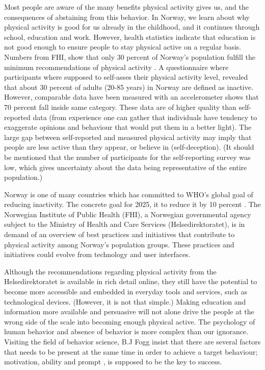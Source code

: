 Most people are aware of the many benefits physical activity gives us, and the consequences of abstaining from this behavior. In Norway, we learn about why physical activity is good for us already in the childhood, and it continues through school, education and work. However, health statistics indicate that education is not good enough to ensure people to stay physical active on a regular basis. Numbers from FHI, show that only 30 percent of Norway's population fulfill the minimum recommendations of physical activity \cite{folkehelseinstituttet_fysisk_nodate}. %
A questionnaire where participants where supposed to self-asses their physical activity level, revealed that about 30 percent of adults (20-85 years) in Norway are defined as inactive. However, comparable data have been measured with an accelerometer shows that 70 percent fall inside same category. These data are of higher quality than self-reported data (from experience one can gather that individuals have tendency to exaggerate opinions and behaviour that would put them in a better light). The large gap between self-reported and measured physical activity may imply that people are less active than they appear, or believe in (self-deception). (It should be mentioned that the number of participants for the self-reporting survey was low, which gives uncertainty about the data being representative of the entire population.) 

Norway is one of many countries which has committed to WHO's global goal of reducing inactivity. The concrete goal for 2025, it to reduce it by 10 percent \cite{noauthor_inaktivitet_nodate}.
The Norwegian Institute of Public Health (FHI), a Norwegian governmental agency subject to the Ministry of Health and Care Services (Helsedirektoratet), is in demand of an overview of best practices and initiatives that contribute to physical activity among Norway's population groups. These practices and initiatives could evolve from technology and user interfaces.

Although the recommendations regarding physical activity from the Helsedirektoratet is available in rich detail online, they still have the potential to become more accessible and embedded in everyday tools and services, such as technological devices. (However, it is not that simple.) Making education and information more available and persuasive will not alone drive the people at the wrong side of the scale into becoming enough physical active. The psychology of human behavior and absence of behavior is more complex than our ignorance. Visiting the field of behavior science, B.J Fogg insist that there are several factors that needs to be present at the same time in order to achieve a target behaviour; motivation, ability and prompt \cite{fogg_persuasive_2003}, is supposed to be the key to success. 

